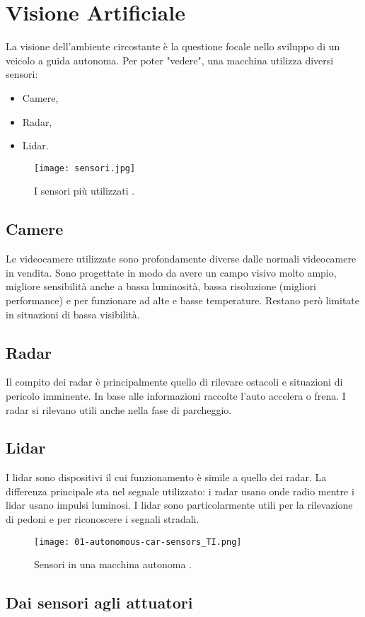 \section{Visione Artificiale}
La visione dell'ambiente circostante è la questione focale nello sviluppo di un veicolo a guida autonoma. Per poter "vedere", una macchina utilizza diversi sensori:
\begin{itemize}
    \item  Camere,
    \item Radar,
    \item Lidar.
\end{itemize}
\begin{figure}[h]
    \texttt{[image: sensori.jpg]}
    \caption{I sensori più utilizzati \cite{lid}.}
    \label{fig:lid}
\end{figure}
\subsection{Camere}
Le videocamere utilizzate sono profondamente diverse dalle normali videocamere in vendita. Sono progettate in modo da avere un campo visivo molto ampio, migliore sensibilità anche a bassa luminosità,
bassa risoluzione (migliori performance) e per funzionare ad alte  e basse temperature. Restano però limitate in situazioni di bassa visibilità.     
\subsection{Radar}
Il compito dei radar è principalmente quello di rilevare ostacoli e situazioni di pericolo imminente. In base alle informazioni raccolte l'auto accelera o frena. 
I radar si rilevano utili anche nella fase di parcheggio.
\subsection{Lidar}
I lidar sono dispositivi il cui funzionamento è simile a quello dei radar. La differenza principale sta nel segnale utilizzato: i radar usano onde radio mentre i lidar usano impulsi luminosi.
I lidar sono particolarmente utili per la rilevazione di pedoni e per riconoscere i segnali stradali.
\begin{figure}[h!]
    \texttt{[image: 01-autonomous-car-sensors\_TI.png]}
    \caption{Sensori in una macchina autonoma \cite{sensors}.}
    \label{fig:sensors}
\end{figure}
\newpage
\subsection{Dai sensori agli attuatori}

